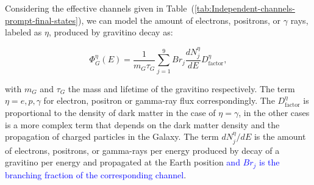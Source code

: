 \documentclass[a4paper,11pt]{article}
\newcommand*{\blue}{\textcolor{blue}}
\begin{document}

Considering the effective channels given in Table~(\ref{tab:Independent-channels-prompt-final-states}), we can  model the amount of electrons, positrons, or $\gamma$ rays, labeled as $\eta$, produced by gravitino decay as:

\begin{equation}
\Phi_{G}^{\eta}(E) = \frac{1}{m_G \tau_G} \sum_{j=1}^9 {Br_j \frac{dN_j^{\eta}}{dE}} D^{\eta}_{\text{factor}},
\label{dm-flux}
\end{equation}

\noindent with $m_G$ and $\tau_G$ the mass and lifetime of the gravitino respectively. The term $\eta = e, p,\gamma$ for electron, positron or gamma-ray flux correspondingly. The $D^{\eta}_{\text{factor}}$ is proportional to the density of dark matter in the case of $\eta=\gamma$, in the other cases is a more complex term that depends on the dark matter density and the propagation of charged particles in the Galaxy. The term $dN_j^{\eta}/dE$ is the amount of electrons, positrons, or gamma-rays per energy produced by decay of a gravitino per energy and propagated at the Earth position \blue{and $Br_j$ is the branching fraction of the corresponding channel}.
\end{document}
